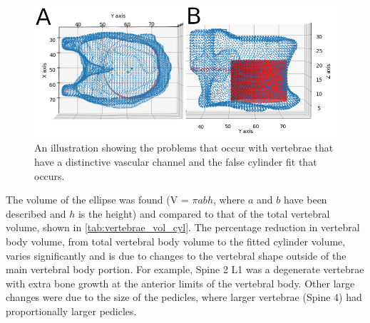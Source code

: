 \begin{figure}[ht!]
  \centering
 
\includegraphics[width=5in]{Chapters/Chapter_HT_images/cyl_fit_channel_both2.png}
  \caption{An illustration showing the problems that occur with vertebrae that
have a distinctive vascular channel and the false cylinder fit that occurs.}
  \label{fig:cyl_channel}
\end{figure}


The volume of the ellipse was found (V = $\pi a b h$, where $a$ and $b$ have
been described and $h$ is the height) and compared to that of the total
vertebral volume, shown in \cref{tab:vertebrae_vol_cyl}.
The percentage reduction in vertebral body volume, from total vertebral body
volume to the fitted cylinder volume, varies significantly and is due to
changes to the vertebral shape outside of the main vertebral body portion.
For example, Spine 2 L1 was a degenerate vertebrae with extra bone growth at
the anterior limits of the vertebral body.
Other large changes were due to the size of the pedicles, where larger
vertebrae (Spine 4) had proportionally larger pedicles.

